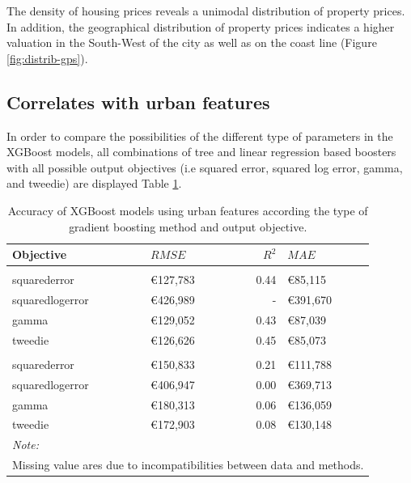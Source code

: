 \documentclass[conference,final,]{IEEEtran}
\begin{document}
The density of housing prices reveals a unimodal distribution of property prices. In addition, the geographical distribution of property prices indicates a higher valuation in the South-West of the city as well as on the coast line (Figure \ref{fig:distrib-gps}).

\hypertarget{correlates-with-urban-features}{%
\subsection{Correlates with urban features}\label{correlates-with-urban-features}}

In order to compare the possibilities of the different type of parameters in the XGBoost models,
all combinations of tree and linear regression based boosters with all possible output objectives (i.e squared error, squared log error, gamma, and tweedie) are displayed Table \ref{tab:osm-model-comparison}.

\begin{table}[H]

\caption{\label{tab:osm-model-comparison}Accuracy of XGBoost models using urban features according the type of gradient boosting method and output objective.}
\centering
\fontsize{8}{10}\selectfont
\begin{tabular}[t]{llrl}
\toprule
Objective & $RMSE$ & $R^2$ & $MAE$\\
\midrule
\addlinespace[0.3em]
\multicolumn{4}{l}{\textbf{Tree based}}\\
\hspace{1em}squarederror & €127,783 & 0.44 & €85,115\\
\hspace{1em}squaredlogerror & €426,989 & - & €391,670\\
\hspace{1em}gamma & €129,052 & 0.43 & €87,039\\
\hspace{1em}tweedie & €126,626 & 0.45 & €85,073\\
\addlinespace[0.3em]
\multicolumn{4}{l}{\textbf{Linear regression based}}\\
\hspace{1em}squarederror & €150,833 & 0.21 & €111,788\\
\hspace{1em}squaredlogerror & €406,947 & 0.00 & €369,713\\
\hspace{1em}gamma & €180,313 & 0.06 & €136,059\\
\hspace{1em}tweedie & €172,903 & 0.08 & €130,148\\
\bottomrule
\multicolumn{4}{l}{\textit{Note: }}\\
\multicolumn{4}{l}{Missing value ares due to incompatibilities between data and methods.}\\
\end{tabular}
\end{table}
\end{document}
